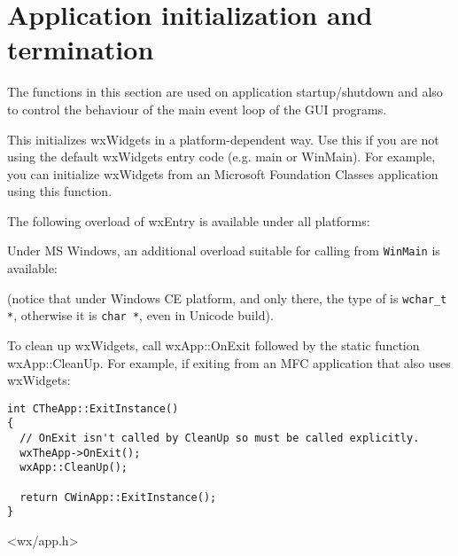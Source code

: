 \section{Application initialization and termination}\label{appinifunctions}

The functions in this section are used on application startup/shutdown and also
to control the behaviour of the main event loop of the GUI programs.


\label{wxentry}

This initializes wxWidgets in a platform-dependent way. Use this if you are not
using the default wxWidgets entry code (e.g. main or WinMain). For example, you
can initialize wxWidgets from an Microsoft Foundation Classes application using
this function.

The following overload of wxEntry is available under all platforms:


Under MS Windows, an additional overload suitable for calling from 
\texttt{WinMain} is available:


(notice that under Windows CE platform, and only there, the type of 
 is \texttt{wchar\_t *}, otherwise it is \texttt{char *}, even in
Unicode build).




To clean up wxWidgets, call wxApp::OnExit followed by the static function
wxApp::CleanUp. For example, if exiting from an MFC application that also uses wxWidgets:

\begin{verbatim}
int CTheApp::ExitInstance()
{
  // OnExit isn't called by CleanUp so must be called explicitly.
  wxTheApp->OnExit();
  wxApp::CleanUp();

  return CWinApp::ExitInstance();
}
\end{verbatim}


<wx/app.h>



\label{wxentrycleanup}

